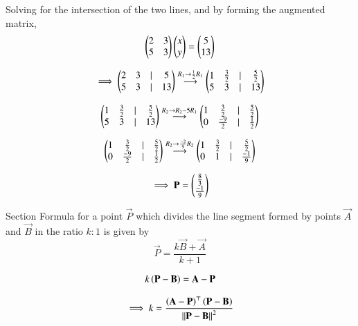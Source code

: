 \documentclass[journal,12pt,onecolumn]{IEEEtran}
\theoremstyle{remark}
\begin{document}
Solving for the intersection of the two lines, and by forming the augmented matrix,\\
\begin{equation}
    \begin{pmatrix}2&3\\5&3\end{pmatrix}\begin{pmatrix}x\\y\end{pmatrix} = \begin{pmatrix}5\\13\end{pmatrix}
\end{equation}

\begin{equation}
    \implies \begin{pmatrix}2&3&|&5\\5&3&|&13\end{pmatrix} \overset{R_1 \rightarrow \frac{1}{2}R_1}{\longrightarrow} \begin{pmatrix}1&\frac{3}{2}&|&\frac{5}{2}\\5&3&|&13\end{pmatrix}
\end{equation}

\begin{equation}
    \begin{pmatrix}1&\frac{3}{2}&|&\frac{5}{2}\\5&3&|&13\end{pmatrix} \overset{R_2 \rightarrow R_2 - 5R_1}{\longrightarrow} \begin{pmatrix}1&\frac{3}{2}&|&\frac{5}{2}\\0&\frac{-9}{2}&|&\frac{1}{2}\end{pmatrix}
\end{equation}

\begin{equation}
    \begin{pmatrix}1&\frac{3}{2}&|&\frac{5}{2}\\0&\frac{-9}{2}&|&\frac{1}{2}\end{pmatrix} \overset{R_2 \rightarrow \frac{-2}{9}R_2}{\longrightarrow} \begin{pmatrix}1&\frac{3}{2}&|&\frac{5}{2}\\0&1&|&\frac{-1}{9}\end{pmatrix} 
\end{equation}

\begin{equation}
    \implies \mathbf{P} = \begin{pmatrix}\frac{8}{3}\\ \frac{-1}{9}\end{pmatrix}
\end{equation}

Section Formula for a point $\vec{P}$ which divides the line segment formed by points $\vec{A}$ and $\vec{B}$ in the ratio $k:1$ is given by\\
\begin{equation}
    \vec{P} = \frac{k\vec{B}+\vec{A}}{k+1}
\end{equation}

\begin{equation}
    k\left(\mathbf{P}-\mathbf{B}\right) = \mathbf{A} - \mathbf{P}
\end{equation}

\begin{equation}
    \implies k = \frac{\left(\mathbf{A}-\mathbf{P}\right)^{\top}\left(\mathbf{P}-\mathbf{B}\right)}{\left\lVert\mathbf{P}-\mathbf{B}\right\rVert^2}
\end{equation}
\end{document}
